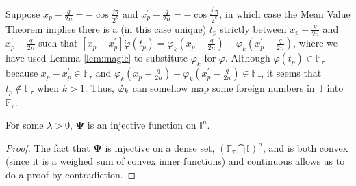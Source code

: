 \begin{remark*}
  Suppose $x_p - \frac{q}{2n} = -\cos \frac{j\pi}{2^k}$ and $x_p^\prime - \frac{q}{2n} = -\cos \frac{j^\prime\pi}{2^k}$, in which case the Mean Value Theorem implies there is a (in this case unique) $t_p$ strictly between $x_p - \frac{q}{2n}$ and $x_p^\prime - \frac{q}{2n}$ such that $\left[x_p - x_p^\prime\right]\dot{\varphi}\left(t_p\right) = \varphi_k\left(x_p - \frac{q}{2n}\right) - \varphi_k\left(x_p^\prime - \frac{q}{2n}\right)$, where we have used Lemma \ref{lem:magic} to substitute $\varphi_k$ for $\varphi$. Although $\dot{\varphi}\left(t_p\right) \in \mathbb{F}_\tau$ because $x_p - x_p^\prime \in \mathbb{F}_\tau$ and $\varphi_k\left(x_p - \frac{q}{2n}\right) - \varphi_k\left(x_p^\prime - \frac{q}{2n}\right) \in \mathbb{F}_\tau$, it seems that $t_p \notin \mathbb{F}_\tau$ when $k > 1$. Thus, $\dotvarphi{k}$ can somehow map some foreign numbers in $\mathbb{T}$ into $\mathbb{F}_\tau$.
\end{remark*}

\begin{proposition}
For some $\lambda > 0$, $\boldsymbol{\Psi}$ is an injective function on $\mathbb{I}^n$.    
\end{proposition}
\begin{proof}
The fact that $\boldsymbol{\Psi}$ is injective on a dense set, $\left(\mathbb{F}_\tau \bigcap \mathbb{I}\right)^n$, and is both convex (since it is a weighed sum of convex inner functions) and continuous allows us to do a proof by contradiction.
\end{proof}


